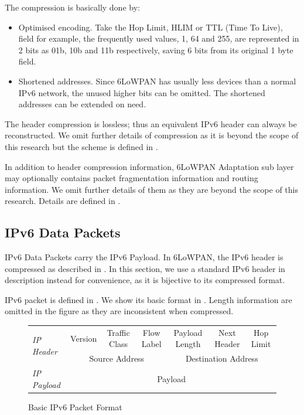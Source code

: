 The compression is basically done by:
\begin{itemize}
	\item Optimised encoding. Take the Hop Limit, HLIM or TTL (Time To Live), field for example, the frequently used values, 1, 64 and 255, are represented in 2 bits as 01b, 10b and 11b respectively, saving 6 bits from its original 1 byte field.
	\item Shortened addresses. Since 6LoWPAN has usually less devices than a normal IPv6 network, the unused higher bits can be omitted. The shortened addresses can be extended on need.
\end{itemize}

The header compression is lossless; thus an equivalent IPv6 header can always be reconstructed. We omit further details of compression as it is beyond the scope of this research but the scheme is defined in \cite{rfc6282}.

In addition to header compression information, 6LoWPAN Adaptation sub layer may optionally contains packet fragmentation information and routing information. We omit further details of them as they are beyond the scope of this research. Details are defined in \cite{rfc4944}.

\subsection{IPv6 Data Packets} \label{Subsec: IPv6 Data Packets}

IPv6 Data Packets carry the IPv6 Payload. In 6LoWPAN, the IPv6 header is compressed as described in . In this section, we use a standard IPv6 header in description instead for convenience, as it is bijective to its compressed format.

IPv6 packet is defined in \cite{rfc2460}. We show its basic format in . Length information are omitted in the figure as they are inconsistent when compressed.

\begin{figure}[th!]
\center
	\begin{tabular}{l|c|c|c|c|c|c|}
	\cline{2-7}
	\multirow{2}{*}{\textit{IP Header}} & Version & Traffic Class & Flow Label & Payload Length & Next Header & Hop Limit \\ \cline{2-7} 
	                                & \multicolumn{3}{c|}{Source Address}  & \multicolumn{3}{c|}{Destination Address} \\ \cline{2-7} 
	\textit{IP Payload}                 & \multicolumn{6}{c|}{Payload}                                                    \\ \cline{2-7} 
	\end{tabular}
	\caption{Basic IPv6 Packet Format} \label{Fig: Basic IPv6 Packet Format}
\end{figure}


